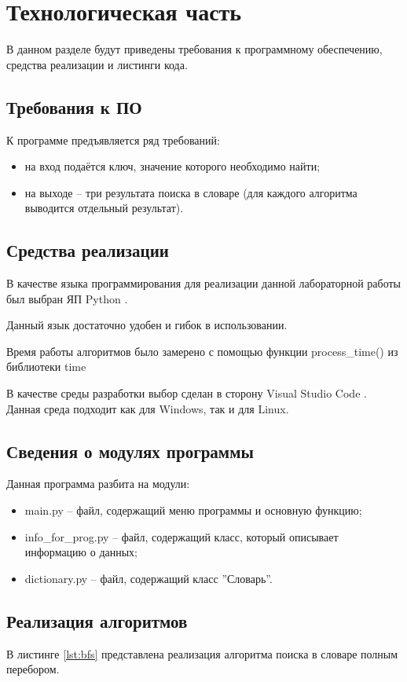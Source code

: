 \chapter{Технологическая часть}
В данном разделе будут приведены требования к программному обеспечению, средства реализации и листинги кода.

\section{Требования к ПО}

К программе предъявляется ряд требований:
\begin{itemize}
	\item на вход подаётся ключ, значение которого необходимо найти;
	\item на выходе -- три результата поиска в словаре (для каждого алгоритма выводится отдельный результат).
\end{itemize}

\section{Средства реализации}

В качестве языка программирования для реализации данной лабораторной работы был выбран ЯП Python \cite{pythonlang}. 

Данный язык достаточно удобен и гибок в использовании. 

Время работы алгоритмов было замерено с помощью функции
 process\_time() из библиотеки time \cite{pythonlangtime}

В качестве среды разработки выбор сделан в сторону Visual Studio Code \cite{wind}. Данная среда подходит как для Windows, так и для Linux.

\section{Сведения о модулях программы}
Данная программа разбита на модули:
\begin{itemize}
	\item main.py -- файл, содержащий меню программы и основную функцию;
	\item info\_for\_prog.py -- файл, содержащий класс, который описывает информацию о данных;
	\item dictionary.py -- файл, содержащий класс ''Словарь''.
\end{itemize}

\section{Реализация алгоритмов}
В листинге \ref{lst:bfs} представлена реализация алгоритма поиска в словаре полным перебором.

